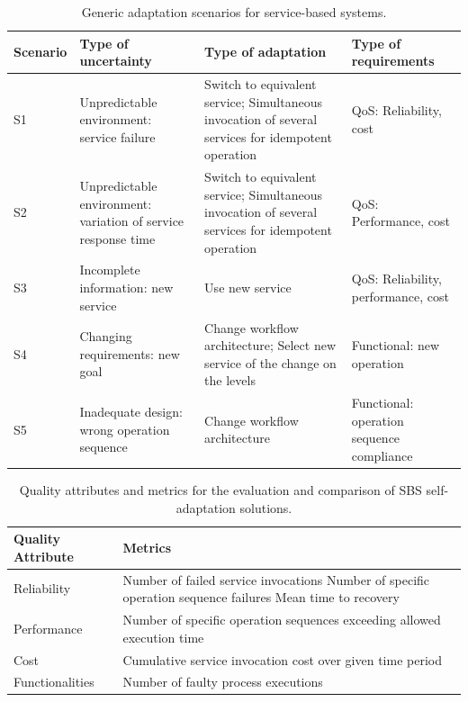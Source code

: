 \begin{table}[ht!b]
	\centering
	\begin{tabular}{|l|p{3.5cm}|p{3.5cm}|p{3.5cm}|}
		\hline 
		\textbf{Scenario} & \textbf{Type of uncertainty} & \textbf{Type of adaptation} & \textbf{Type of requirements}  \\
		\hline 
		S1 & Unpredictable environment: service failure  & Switch to equivalent service; Simultaneous invocation of several services for idempotent operation & QoS: Reliability, cost \\
		\hline 
		S2 & Unpredictable environment: variation of service response time & Switch to equivalent service; Simultaneous invocation of several services for idempotent operation & QoS: Performance, cost \\
		\hline 
		S3 & Incomplete information: new service & Use new service & QoS: Reliability, performance, cost \\ 
		\hline 
		S4 & Changing requirements: new goal & Change workflow architecture; Select new service of the change on the levels & Functional: new operation \\ 
		\hline 
		S5 & Inadequate design: wrong operation sequence & Change workflow architecture & Functional: operation sequence compliance \\ 
		\hline
		
	\end{tabular} 
	\caption[TAS Scenarios]{Generic adaptation scenarios for service-based systems\cite{teleassist}.}
	\label{tab:tas-scenarios}
\end{table}

\begin{table}[ht!b]
	\centering
	\begin{tabular}{|p{3cm}|p{10cm}|}
		\hline 
		\textbf{Quality Attribute} & \textbf{Metrics} \\ 
		\hline 
		Reliability & Number of failed service invocations
		Number of specific operation sequence failures
		Mean time to recovery \\ 
		\hline 
		Performance & Number of specific operation sequences exceeding allowed execution time \\ 
		\hline 
		Cost & Cumulative service invocation cost over given time period \\ 
		\hline 
		Functionalities & Number of faulty process executions \\ 
		\hline 
		
	\end{tabular} 
	\caption[TAS Metrics]{Quality attributes and metrics for the evaluation and comparison of SBS self-adaptation solutions\cite{teleassist}.}
	\label{tab:tas-metrics}
\end{table}

